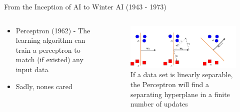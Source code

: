 \begin{frame}{From the Inception of AI to Winter AI (1943 - 1973)}
    \begin{columns}
        \begin{column}{0.5\textwidth}
            \begin{itemize}
                \item Perceptron (1962) - The learning algorithm can train a perceptron to match (if existed) any input data
                \item Sadly, nones cared
            \end{itemize}
        \end{column}

        \begin{column}{0.5\textwidth}
            \begin{figure}
                \centering
                \includegraphics[width=\linewidth]{img/perceptron_update.png}
                \caption{If a data set is linearly separable, the Perceptron will find a separating hyperplane in a finite number of updates}
            \end{figure}
        \end{column}
    \end{columns}
\end{frame}

